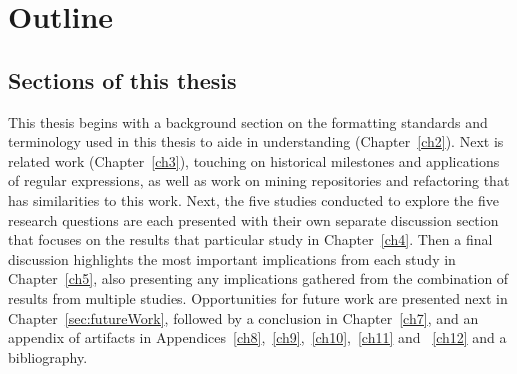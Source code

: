 \section{Outline}

\subsection{Sections of this thesis}
This thesis begins with a background section on the formatting standards and terminology used in this thesis to aide in understanding (Chapter~\ref{ch2}). Next is related work (Chapter~\ref{ch3}), touching on historical milestones and applications of regular expressions, as well as work on mining repositories and refactoring that has similarities to this work. Next, the five studies conducted to explore the five research questions are each presented with their own separate discussion section that focuses on the results that particular study in Chapter~\ref{ch4}.  Then a final discussion highlights the most important implications from each study in Chapter~\ref{ch5}, also presenting any implications gathered from the combination of results from multiple studies. Opportunities for future work are presented next in Chapter~\ref{sec:futureWork}, followed by a conclusion in Chapter~\ref{ch7}, and an appendix of artifacts in Appendices~\ref{ch8},~\ref{ch9},~\ref{ch10},~\ref{ch11} and ~\ref{ch12} and a bibliography.
